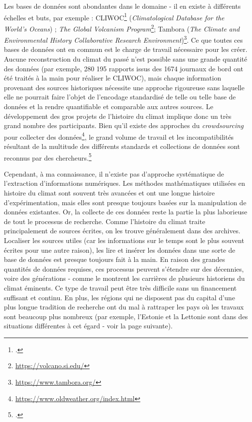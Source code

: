 \documentclass[a4paper,twoside,12pt]{article}
\begin{document}
Les bases de données sont abondantes dans le domaine - il en existe à différents échelles et buts, par exemple : CLIWOC\footcite{konnen_description_2005} (\textit{Climatological Database for the World's Oceans}) ; \textit{The Global Volcanism Program}\footnote{\url{https://volcano.si.edu/}}; Tambora (\textit{The Climate and Environmental History Collaborative Research Environment})\footnote{\url{https://www.tambora.org/}}. Ce que toutes ces bases de données ont en commun est le charge de travail nécessaire pour les créer. Aucune reconstruction du climat du passé n'est possible sans une grande quantité des données (par exemple, 280 195 rapports issus des 1674 journaux de bord ont été traités à la main pour réaliser le CLIWOC), mais chaque information provenant des sources historiques nécessite une approche rigoureuse sans laquelle elle ne pourrait faire l'objet de l'encodage standardisé de telle ou telle base de données et la rendre quantifiable et comparable aux autres sources. Le développement des gros projets de l'histoire du climat implique donc un très grand nombre des participants. Bien qu'il existe des approches du \textit{crowdsourcing} pour collecter des données\footnote{\url{https://www.oldweather.org/index.html}}, le grand volume de travail et les incompatibilités résultant de la multitude des différents standards et collections de données sont reconnus par des chercheurs.\footcite{veale_dealing_2017}

Cependant, à ma connaissance, il n'existe pas d'approche systématique de l'extraction d'informations numériques. Les méthodes mathématiques utilisées en histoire du climat sont souvent très avancées et ont une longue histoire d'expérimentation, mais elles sont presque toujours basées sur la manipulation de données existantes. Or, la collecte de ces données reste la partie la plus laborieuse de tout le processus de recherche. Comme l'histoire du climat traite principalement de sources écrites, on les trouve généralement dans des archives. Localiser les sources utiles (car les informations sur le temps sont le plus souvent écrites pour une autre raison), les lire et insérer les données dans une sorte de base de données est presque toujours fait à la main. En raison des grandes quantités de données requises, ces processus peuvent s'étendre sur des décennies, voire des générations - comme le montrent les carrières de plusieurs historiens du climat éminents. Ce type de travail peut être très difficile sans un financement suffisant et continu. En plus, les régions qui ne disposent pas du capital d'une plus longue tradition de recherche ont du mal à rattraper les pays où les travaux sont beaucoup plus nombreux (par exemple, l'Estonie et la Lettonie sont dans des situations différentes à cet égard - voir la page suivante).
\end{document}
